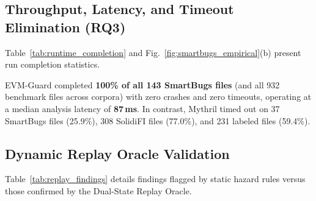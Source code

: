 \documentclass[conference]{IEEEtran}
\begin{document}
\subsection{Throughput, Latency, and Timeout Elimination (RQ3)}
Table~\ref{tab:runtime_completion} and Fig.~\ref{fig:smartbugs_empirical}(b) present run completion statistics.

\begin{table}[h]
\centering
\small
\renewcommand{\arraystretch}{1.12}
\caption{Tool Execution Outcomes and Wall Time on SmartBugs-Curated}
\label{tab:runtime_completion}
\end{table}

EVM-Guard completed \textbf{100\% of all 143 SmartBugs files} (and all 932 benchmark files across corpora) with zero crashes and zero timeouts, operating at a median analysis latency of \textbf{87\,ms}. In contrast, Mythril timed out on 37 SmartBugs files (25.9\%), 308 SolidiFI files (77.0\%), and 231 labeled files (59.4\%). 

\subsection{Dynamic Replay Oracle Validation}
Table~\ref{tab:replay_findings} details findings flagged by static hazard rules versus those confirmed by the Dual-State Replay Oracle.

\begin{table}[h]
\centering
\small
\renewcommand{\arraystretch}{1.12}
\caption{EVM-Guard Findings Flagged (F) vs. Sandbox Replay Confirmed (C) with File-Level Precision}
\label{tab:replay_findings}
\end{table}
\end{document}
